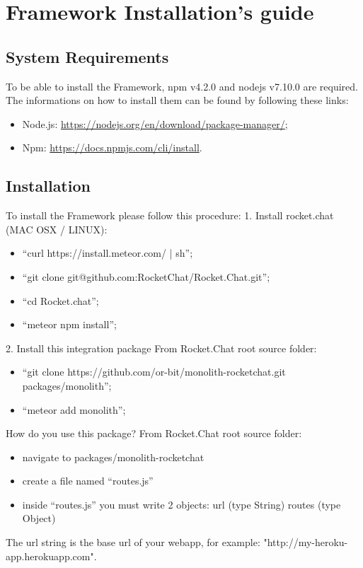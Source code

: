 \section{Framework Installation's guide}

\subsection{System Requirements}
To be able to install the Framework, npm v4.2.0 and nodejs v7.10.0 are required. The informations on how to install them can be found by following these links:
\begin{itemize}
	\item Node.js: \url{https://nodejs.org/en/download/package-manager/};
	\item Npm: \url{https://docs.npmjs.com/cli/install}.
\end{itemize}

\subsection{Installation}

To install the Framework  please follow this procedure:
1. Install rocket.chat (MAC OSX / LINUX):
\begin{itemize}
    \item ``curl https://install.meteor.com/ | sh'';
    \item ``git clone git@github.com:RocketChat/Rocket.Chat.git'';
    \item ``cd Rocket.chat'';
    \item ``meteor npm install''; 
\end{itemize}

2. Install this integration package
  From Rocket.Chat root source folder:
 \begin{itemize}
    \item ``git clone https://github.com/or-bit/monolith-rocketchat.git packages/monolith'';
    \item ``meteor add monolith'';
\end{itemize}

How do you use this package?
From Rocket.Chat root source folder:
\begin{itemize}
\item navigate to packages/monolith-rocketchat
\item create a file named ``routes.js''
\item inside ``routes.js'' you must write 2 objects:   url (type String)  routes (type Object)
\end{itemize}

The url string is the base url of your webapp, for example: "http://my-heroku-app.herokuapp.com".

